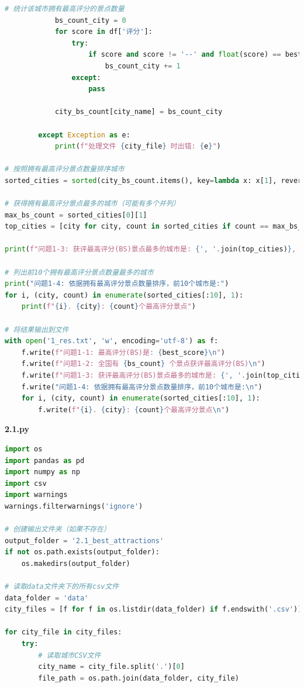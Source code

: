 \documentclass[withoutpreface,bwprint]{cumcmthesis} %
\begin{document}
\begin{appendices}
\begin{lstlisting}[language=python]
            # 统计该城市拥有最高评分的景点数量
            bs_count_city = 0
            for score in df['评分']:
                try:
                    if score and score != '--' and float(score) == best_score:
                        bs_count_city += 1
                except:
                    pass
            
            city_bs_count[city_name] = bs_count_city
            
        except Exception as e:
            print(f"处理文件 {city_file} 时出错: {e}")

# 按照拥有最高评分景点数量排序城市
sorted_cities = sorted(city_bs_count.items(), key=lambda x: x[1], reverse=True)

# 获得拥有最高评分景点最多的城市（可能有多个并列）
max_bs_count = sorted_cities[0][1]
top_cities = [city for city, count in sorted_cities if count == max_bs_count]

print(f"问题1-3: 获评最高评分(BS)景点最多的城市是: {', '.join(top_cities)}, 各有 {max_bs_count} 个最高评分景点")

# 列出前10个拥有最高评分景点数量最多的城市
print("问题1-4: 依据拥有最高评分景点数量排序，前10个城市是:")
for i, (city, count) in enumerate(sorted_cities[:10], 1):
    print(f"{i}. {city}: {count}个最高评分景点")

# 将结果输出到文件
with open('1_res.txt', 'w', encoding='utf-8') as f:
    f.write(f"问题1-1: 最高评分(BS)是: {best_score}\n")
    f.write(f"问题1-2: 全国有 {bs_count} 个景点获评最高评分(BS)\n")
    f.write(f"问题1-3: 获评最高评分(BS)景点最多的城市是: {', '.join(top_cities)}, 各有 {max_bs_count} 个最高评分景点\n")
    f.write("问题1-4: 依据拥有最高评分景点数量排序，前10个城市是:\n")
    for i, (city, count) in enumerate(sorted_cities[:10], 1):
        f.write(f"{i}. {city}: {count}个最高评分景点\n")
 \end{lstlisting}


\textbf{2.1.py}
\begin{lstlisting}[language=python]
import os
import pandas as pd
import numpy as np
import csv
import warnings
warnings.filterwarnings('ignore')

# 创建输出文件夹（如果不存在）
output_folder = '2.1_best_attractions'
if not os.path.exists(output_folder):
    os.makedirs(output_folder)

# 读取data文件夹下的所有csv文件
data_folder = 'data'
city_files = [f for f in os.listdir(data_folder) if f.endswith('.csv')]

for city_file in city_files:
    try:
        # 读取城市CSV文件
        city_name = city_file.split('.')[0]
        file_path = os.path.join(data_folder, city_file)
        

\end{lstlisting}
\end{appendices}
\end{document}

